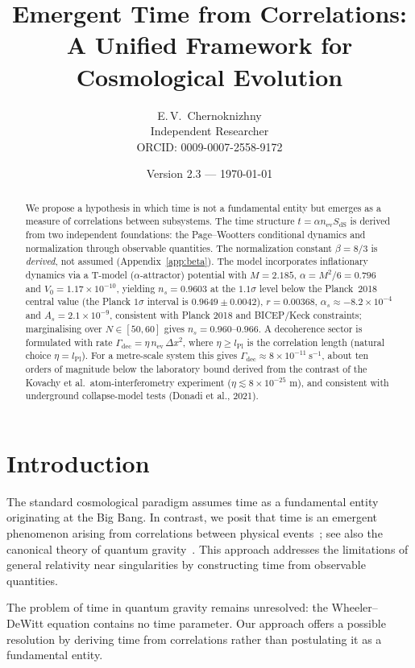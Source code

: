 \documentclass[11pt,a4paper]{article}
\title{Emergent Time from Correlations:\\
A Unified Framework for Cosmological Evolution}
\author{E.\,V.~Chernoknizhny\\
Independent Researcher\\
ORCID: 0009-0007-2558-9172}
\date{Version 2.3 --- \today}
\begin{document}
\linenumbers
\maketitle

\begin{abstract}
We propose a hypothesis in which time is not a fundamental entity but
emerges as a measure of correlations between subsystems. The time
structure $t=\alpha n_{\mathrm{ev}}S_{\mathrm{dS}}$ is derived from
two independent foundations: the Page--Wootters conditional dynamics
and normalization through observable quantities. The normalization
constant $\beta=8/3$ is \emph{derived}, not assumed (Appendix~\ref{app:beta}).
The model incorporates inflationary dynamics via a T-model
($\alpha$-attractor) potential with $M=2.185$, $\alpha=M^{2}/6=0.796$
and $V_{0}=1.17\times10^{-10}$, yielding $n_{s}=0.9603$ at the
$1.1\sigma$ level below the Planck~2018 central value (the Planck
$1\sigma$ interval is $0.9649\pm0.0042$), $r=0.00368$,
$\alpha_{s}\approx-8.2\times10^{-4}$ and $A_{s}=2.1\times10^{-9}$,
consistent with Planck 2018 and BICEP/Keck constraints;
marginalising over $N\in[50,60]$ gives $n_{s}=0.960$--$0.966$.
A decoherence sector is formulated with rate
$\Gamma_{\mathrm{dec}}=\eta\,n_{\mathrm{ev}}\,\Delta x^{2}$, where
$\eta\ge l_{\mathrm{Pl}}$ is the correlation length (natural choice
$\eta=l_{\mathrm{Pl}}$). For a metre-scale system this gives
$\Gamma_{\mathrm{dec}}\approx8\times10^{-11}\ \mathrm{s^{-1}}$, about
ten orders of magnitude below the laboratory bound derived from the
contrast of the Kovachy et al.\ atom-interferometry experiment
($\eta\lesssim8\times10^{-25}$ m), and consistent with underground
collapse-model tests (Donadi et al., 2021).
\end{abstract}

\tableofcontents

\section{Introduction}
The standard cosmological paradigm assumes time as a fundamental
entity originating at the Big Bang. In contrast, we posit that time
is an emergent phenomenon arising from correlations between physical
events~\cite{PageWootters}; see also the canonical theory of quantum
gravity~\cite{DeWitt}. This approach addresses the limitations of
general relativity near singularities by constructing time from
observable quantities.

The problem of time in quantum gravity remains unresolved: the
Wheeler--DeWitt equation contains no time parameter. Our approach
offers a possible resolution by deriving time from correlations
rather than postulating it as a fundamental entity.
\end{document}
